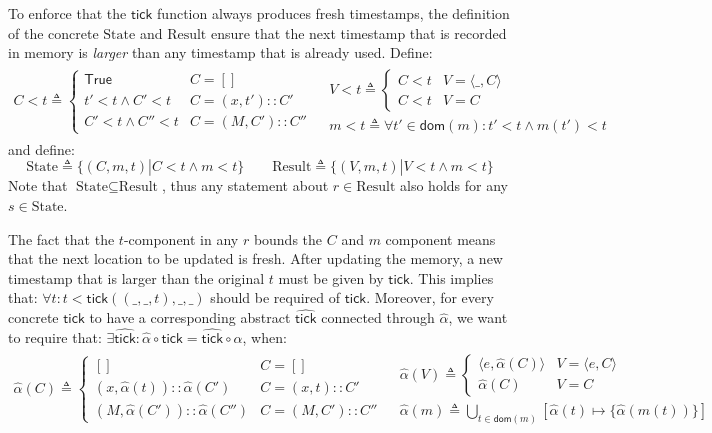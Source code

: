 \documentclass{article}
\theoremstyle{definition}
\newcommand*{\cons}{::}
\newcommand*{\mem}{m}
\newcommand*{\State}{\text{State}}
\newcommand*{\Result}{\text{Result}}
\newcommand*{\tick}{\mathsf{tick}}
\begin{document}
To enforce that the $\tick$ function always produces fresh timestamps, the definition of the concrete $\State$ and $\Result$ ensure that the next timestamp that is recorded in memory is \emph{larger} than any timestamp that is already used.
Define:
\[
  \begin{array}{cc}
    C < t\triangleq
    \begin{cases}
      \mathsf{True}        & C=[]              \\
      t' < t\wedge C' < t  & C=(x,t')\cons C'  \\
      C' < t\wedge C'' < t & C=(M,C')\cons C''
    \end{cases}
     &
    \begin{array}{l}
      V < t\triangleq
      \begin{cases}
        C < t & V=\langle\_,C\rangle \\
        C < t & V=C
      \end{cases} \\
      \mem < t\triangleq\forall t'\in\mathsf{dom}(\mem):t'<t\wedge\mem(t') < t
    \end{array}
  \end{array}
\]
and define:
\[
  \State\triangleq\{(C,m,t)|C<t\wedge m<t\}\qquad
  \Result\triangleq\{(V,m,t)|V<t\wedge m<t\}
\]
Note that $\State\subseteq\Result$, thus any statement about $r\in\Result$ also holds for any $s\in\State$.

The fact that the $t$-component in any $r$ bounds the $C$ and $m$ component means that the next location to be updated is fresh.
After updating the memory, a new timestamp that is larger than the original $t$ must be given by $\tick$.
This implies that: $\forall t:t<\tick((\_,\_,t),\_,\_)$ should be required of $\tick$.
Moreover, for every concrete $\tick$ to have a corresponding abstract $\widehat{\tick}$ connected through $\widehat{\alpha}$, we want to require that:
$\exists\widehat{\tick}:\widehat{\alpha}\circ\tick=\widehat{\tick}\circ\widehat{\alpha}$, when:
\[
  \begin{array}{cc}
    \widehat{\alpha}(C)\triangleq
    \begin{cases}
      []                                              & C=[]              \\
      (x,\widehat{\alpha}(t))::\widehat{\alpha}(C')   & C=(x,t)\cons C'   \\
      (M,\widehat{\alpha}(C'))::\widehat{\alpha}(C'') & C=(M,C')\cons C''
    \end{cases}
     &
    \begin{array}{l}
      \widehat{\alpha}(V)\triangleq
      \begin{cases}
        \langle e,\widehat{\alpha}(C)\rangle & V=\langle e,C\rangle \\
        \widehat{\alpha}(C)                  & V=C
      \end{cases} \\
      \widehat{\alpha}(\mem)\triangleq\bigcup_{t\in\mathsf{dom}(\mem)}[\widehat{\alpha}(t)\mapsto\{\widehat{\alpha}(\mem(t))\}]
    \end{array}
  \end{array}
\]
\end{document}
